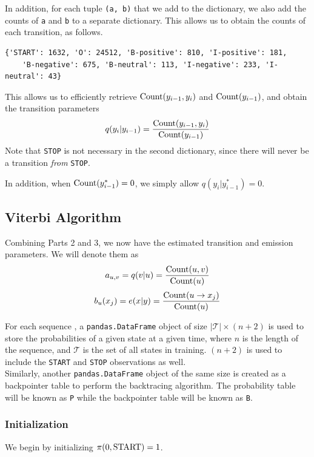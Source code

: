\documentclass{article}
\begin{document}
In addition, for each tuple \lstinline{(a, b)} that we add to the dictionary, we also add the counts of \lstinline{a} and \lstinline{b} to a separate dictionary. This allows us to obtain the counts of each transition, as follows.

\begin{verbatim}
{'START': 1632, 'O': 24512, 'B-positive': 810, 'I-positive': 181,
    'B-negative': 675, 'B-neutral': 113, 'I-negative': 233, 'I-neutral': 43}
\end{verbatim}

This allows us to efficiently retrieve $\text{\lstinline{Count}}(y_{i-1}, y_i)$ and $\text{\lstinline{Count}}(y_{i-1})$, and obtain the transition parameters
	$$q(y_i | y_{i-1}) = \frac{\text{\lstinline{Count}}(y_{i-1}, y_i)}{\text{\lstinline{Count}}(y_{i-1})}$$
Note that \lstinline{STOP} is not necessary in the second dictionary, since there will never be a transition \emph{from} \lstinline{STOP}.

In addition, when $\text{\lstinline{Count}}(y^*_{i-1}) = 0$, we simply allow $q(y_i | y^*_{i-1}) = 0$.

\subsection{Viterbi Algorithm}
Combining Parts 2 and 3, we now have the estimated transition and emission parameters. We will denote them as
	$$ a_{u, v} = q(v | u) = \frac{\text{\lstinline{Count}}(u, v)}{\text{\lstinline{Count}}(u)} $$
	$$ b_u(x_j) = e(x | y) = \frac{\text{\lstinline{Count}}(u \rightarrow x_j)}{\text{\lstinline{Count}}(u)} $$

For each sequence , a \lstinline{pandas.DataFrame} object of size $\lvert\mathcal{T}\rvert \times (n+2)$ is used to store the probabilities of a given state at a given time, where $n$ is the length of the sequence, and $\mathcal{T}$ is the set of all states in training. $(n+2)$ is used to include the \lstinline{START} and \lstinline{STOP} observations as well.\\

Similarly, another \lstinline{pandas.DataFrame} object of the same size is created as a backpointer table to perform the backtracing algorithm. The probability table will be known as \lstinline{P} while the backpointer table will be known as \lstinline{B}.

\subsubsection{Initialization}
We begin by initializing $\pi(0, \text{\lstinline{START}}) = 1$.
\end{document}
